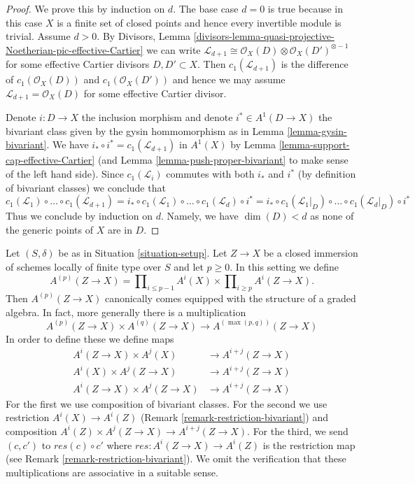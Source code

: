 \begin{proof}
We prove this by induction on $d$. The base case $d = 0$ is true because
in this case $X$ is a finite set of closed points and hence every invertible
module is trivial. Assume $d > 0$. By Divisors, Lemma
\ref{divisors-lemma-quasi-projective-Noetherian-pic-effective-Cartier}
we can write $\mathcal{L}_{d + 1} \cong \mathcal{O}_X(D) \otimes
\mathcal{O}_X(D')^{\otimes -1}$ for some effective Cartier divisors
$D, D' \subset X$. Then $c_1(\mathcal{L}_{d + 1})$ is the difference
of $c_1(\mathcal{O}_X(D))$ and $c_1(\mathcal{O}_X(D'))$ and hence
we may assume $\mathcal{L}_{d + 1} = \mathcal{O}_X(D)$ for some
effective Cartier divisor.

\medskip\noindent
Denote $i : D \to X$ the inclusion morphism and denote
$i^* \in A^1(D \to X)$ the bivariant class given by the
gysin hommomorphism as in Lemma \ref{lemma-gysin-bivariant}.
We have $i_* \circ i^* = c_1(\mathcal{L}_{d + 1})$
in $A^1(X)$ by Lemma \ref{lemma-support-cap-effective-Cartier}
(and Lemma \ref{lemma-push-proper-bivariant}
to make sense of the left hand side).
Since $c_1(\mathcal{L}_i)$ commutes with
both $i_*$ and $i^*$ (by definition of bivariant classes)
we conclude that
$$
c_1(\mathcal{L}_1) \circ \ldots \circ c_1(\mathcal{L}_{d + 1}) =
i_* \circ c_1(\mathcal{L}_1) \circ \ldots \circ c_1(\mathcal{L}_d) \circ i^* =
i_* \circ c_1(\mathcal{L}_1|_D) \circ \ldots \circ c_1(\mathcal{L}_d|_D)
\circ i^*
$$
Thus we conclude by induction on $d$. Namely, we have $\dim(D) < d$
as none of the generic points of $X$ are in $D$.
\end{proof}

\begin{remark}
\label{remark-ring-loc-classes}
Let $(S, \delta)$ be as in Situation \ref{situation-setup}.
Let $Z \to X$ be a closed immersion of schemes locally of
finite type over $S$ and let $p \geq 0$. In this setting we define
$$
A^{(p)}(Z \to X) =
\prod\nolimits_{i \leq p - 1} A^i(X) \times
\prod\nolimits_{i \geq p} A^i(Z \to X).
$$
Then $A^{(p)}(Z \to X)$ canonically comes equipped with the structure
of a graded algebra. In fact, more generally there is a multiplication
$$
A^{(p)}(Z \to X) \times A^{(q)}(Z \to X)
\longrightarrow A^{(\max(p, q))}(Z \to X)
$$
In order to define these we define maps
\begin{align*}
A^i(Z \to X) \times A^j(X) & \to A^{i + j}(Z \to X) \\
A^i(X) \times A^j(Z \to X) & \to A^{i + j}(Z \to X) \\
A^i(Z \to X) \times A^j(Z \to X) & \to A^{i + j}(Z \to X)
\end{align*}
For the first we use composition of bivariant classes.
For the second we use restriction
$A^i(X) \to A^i(Z)$ (Remark \ref{remark-restriction-bivariant}) and
composition $A^i(Z) \times A^j(Z \to X) \to A^{i + j}(Z \to X)$.
For the third, we send $(c, c')$ to $res(c) \circ c'$
where $res : A^i(Z \to X) \to A^i(Z)$ is the restriction map (see
Remark \ref{remark-restriction-bivariant}). We omit the
verification that these multiplications are associative in a suitable sense.
\end{remark}


